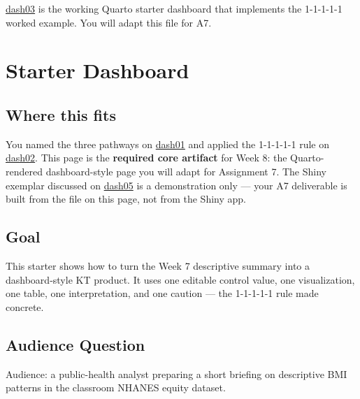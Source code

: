 \documentclass[
  letterpaper,
  DIV=11,
  numbers=noendperiod,
  oneside]{scrreprt}
\begin{document}

\href{dash03-starter-dashboard.qmd}{dash03} is the working Quarto
starter dashboard that implements the 1-1-1-1-1 worked example. You will
adapt this file for A7.

\chapter*{Starter Dashboard}\label{starter-dashboard}


\section*{Where this fits}\label{where-this-fits-13}


You named the three pathways on
\hyperref[what-a-dashboard-is-and-three-pathways]{dash01} and applied
the 1-1-1-1-1 rule on
\hyperref[from-one-finding-to-a-prototype-the-1-1-1-1-1-rule]{dash02}.
This page is the \textbf{required core artifact} for Week 8: the
Quarto-rendered dashboard-style page you will adapt for Assignment 7.
The Shiny exemplar discussed on
\href{dash05-testing-privacy-and-shiny-demo.qmd}{dash05} is a
demonstration only --- your A7 deliverable is built from the file on
this page, not from the Shiny app.

\section*{Goal}\label{goal-8}


This starter shows how to turn the Week 7 descriptive summary into a
dashboard-style KT product. It uses one editable control value, one
visualization, one table, one interpretation, and one caution --- the
1-1-1-1-1 rule made concrete.

\section*{Audience Question}\label{audience-question}


Audience: a public-health analyst preparing a short briefing on
descriptive BMI patterns in the classroom NHANES equity dataset.
\end{document}
